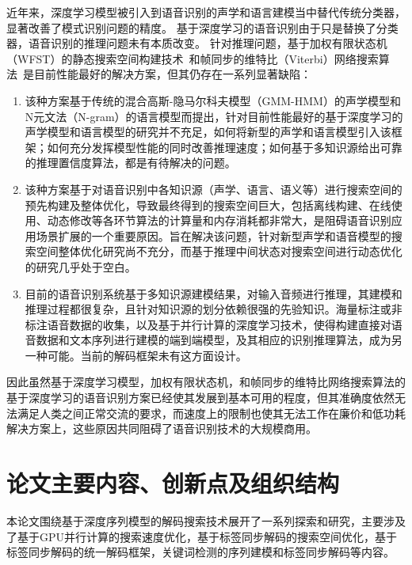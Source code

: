 近年来，深度学习模型被引入到语音识别的声学和语言建模当中替代传统分类器，显著改善了模式识别问题的精度。 基于深度学习的语音识别由于只是替换了分类器，语音识别的推理问题未有本质改变。
针对推理问题，基于加权有限状态机（WFST）的静态搜索空间构建技术~\cite{mohri2002weighted}和帧同步的维特比（Viterbi）网络搜索算法~\cite{forney1973viterbi}是目前性能最好的解决方案，但其仍存在一系列显著缺陷：
\begin{enumerate}
\item 该种方案基于传统的混合高斯-隐马尔科夫模型（GMM-HMM）的声学模型和N元文法（N-gram）的语言模型而提出，针对目前性能最好的基于深度学习的声学模型和语言模型的研究并不充足，如何将新型的声学和语言模型引入该框架；如何充分发挥模型性能的同时改善推理速度；如何基于多知识源给出可靠的推理置信度算法，都是有待解决的问题。
\item 该种方案基于对语音识别中各知识源（声学、语言、语义等）进行搜索空间的预先构建及整体优化，导致最终得到的搜索空间巨大，包括离线构建、在线使用、动态修改等各环节算法的计算量和内存消耗都非常大，是阻碍语音识别应用场景扩展的一个重要原因。旨在解决该问题，针对新型声学和语音模型的搜索空间整体优化研究尚不充分，而基于推理中间状态对搜索空间进行动态优化的研究几乎处于空白。
\item 目前的语音识别系统基于多知识源建模结果，对输入音频进行推理，其建模和推理过程都很复杂，且针对知识源的划分依赖很强的先验知识。海量标注或非标注语音数据的收集，以及基于并行计算的深度学习技术，使得构建直接对语音数据和文本序列进行建模的端到端模型，及其相应的识别推理算法，成为另一种可能。当前的解码框架未有这方面设计。
\end{enumerate}

因此虽然基于深度学习模型，加权有限状态机，和帧同步的维特比网络搜索算法的基于深度学习的语音识别方案已经使其发展到基本可用的程度，但其准确度依然无法满足人类之间正常交流的要求，而速度上的限制也使其无法工作在廉价和低功耗解决方案上，这些原因共同阻碍了语音识别技术的大规模商用。


\section{论文主要内容、创新点及组织结构}
\label{chap:intro0-thesis}
本论文围绕基于深度序列模型的解码搜索技术展开了一系列探索和研究，主要涉及
了基于GPU并行计算的搜索速度优化，基于标签同步解码的搜索空间优化，基于标签同步解码的统一解码框架，关键词检测的序列建模和标签同步解码等内容。

